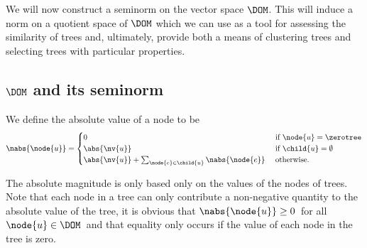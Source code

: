 We will now construct a seminorm on the vector space
$\DOM$. This will induce a norm on a quotient space of $\DOM$ which we
can use as a tool for assessing the similarity of trees and,
ultimately, provide both a means of clustering trees and selecting
trees with particular properties.

\subsection{$\DOM$ and its seminorm}
\begin{definition}\label{absolute-mag}
 We define the absolute value of a node to be
\begin{align*}
\nabs{\node{u}} = \begin{cases}
  0 & \text{ if } \node{u} = \zerotree \\
  \abs{\nv{u}} & \text{ if }\child{u} = \emptyset \\
  \abs{\nv{u}} + \sum_{\node{e}\in\child{u}}\nabs{\node{e}} & \text{ otherwise.}
\end{cases}
\end{align*}
\end{definition}
The absolute magnitude is only based only on the values of the
nodes of trees. %
Note that each node in a tree can only contribute a non-negative
quantity to the absolute value of the tree, it is obvious that
\(\nabs{\node{u}} \geq 0\)\ for all \(\node{u} \in \DOM\)\ and that
equality only occurs if the value of each node in the tree 
is zero.

